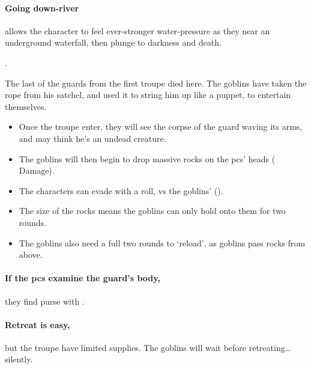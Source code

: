 \begin{multicols}{2}

\paragraph{Going down-river}
allows the character to feel ever-stronger water-pressure as they near an underground waterfall, then plunge to darkness and death.

.


\begin{exampletext}
  The last of the \glspl{guard} from the first troupe died here.
  The goblins have taken the rope from his satchel, and used it to string him up like a puppet, to entertain themselves.
\end{exampletext}

\begin{itemize}
  \item
  Once the troupe enter, they will see the corpse of the \gls{guard} waving its arms, and may think he's an undead creature.
  \item
  The goblins will then begin to drop massive rocks on the \glspl{pc}' heads ( Damage).
  \item
  The characters can evade with a  roll, vs the goblins'  (\tn).
  \item
  The size of the rocks means the goblins can only hold onto them for two \glspl{round}.
  \item
  The goblins also need a full two rounds to `reload', as goblins pass rocks from above.
\end{itemize}

\paragraph{If the \glspl{pc} examine the \gls{guard}'s body,}
they find  purse with \lootMedium.
\label{caveCoinsIII}
\setcounter{diceNo}{0}%
\renewcommand\npcsymbol{\currency}

\paragraph{Retreat is easy,}
but the troupe have limited supplies.
The goblins will wait  before retreating\ldots silently.


\end{multicols}
